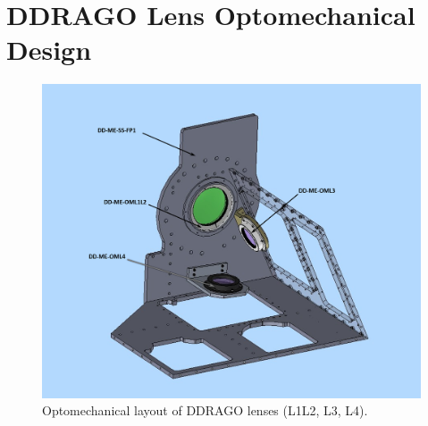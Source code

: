 \documentclass{report}
\begin{document}



\chapter{DDRAGO Lens Optomechanical Design}

\begin{figure}
\begin{center}
\includegraphics[width=0.7\linewidth]{figures/DDRAGO_OPTOMECH_LAYOUT_w_labels.png}
\end{center}
\caption{Optomechanical layout of DDRAGO lenses (L1L2, L3, L4).}
\label{figure:rosalia-DDRAGO-OPTOMECH}
\end{figure}
\end{document}
